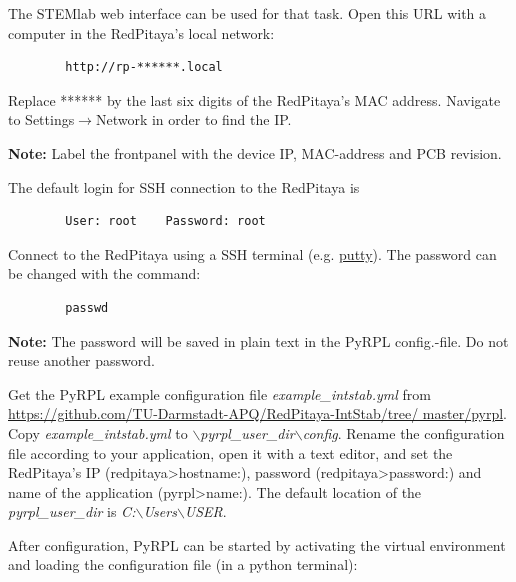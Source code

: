 \documentclass[twoside,a4paper]{refart}
\begin{document}
The STEMlab web interface can be used for that task. Open this URL with a computer in the RedPitaya's local network:
\begin{tcolorbox}
	\begin{verbatim}
		http://rp-******.local
	\end{verbatim}
\end{tcolorbox}
Replace ****** by the last six digits of the RedPitaya's MAC address. Navigate to Settings$\rightarrow$Network in order to find the IP.

\textbf{Note:}
Label the frontpanel with the device IP, MAC-address and PCB revision.


 The default login for SSH connection to the RedPitaya is

\begin{tcolorbox}
	\begin{verbatim}
		User: root    Password: root
	\end{verbatim}
\end{tcolorbox}

Connect to the RedPitaya using a SSH terminal (e.g. \href{https://www.putty.org/}{putty}). The password can be changed with the command:
\begin{tcolorbox}
	\begin{verbatim}
		passwd
	\end{verbatim}
\end{tcolorbox}

\textbf{Note: }The password will be saved in plain text in the PyRPL config.-file. Do not reuse another password.

Get the PyRPL example configuration file \textit{example\_intstab.yml} from \href{https://github.com/TU-Darmstadt-APQ/RedPitaya-IntStab/tree/master/pyrpl}{https://github.com/TU-Darmstadt-APQ/RedPitaya-IntStab/tree/ master/pyrpl}. Copy \textit{example\_intstab.yml} to \textit{$\backslash$pyrpl\_user\_dir$\backslash$config}. Rename the configuration file according to your application, open it with a text editor, and set the RedPitaya's IP (redpitaya>hostname:), password  (redpitaya>password:) and name of the application (pyrpl>name:). The default location of the \textit{pyrpl\_user\_dir} is \textit{C:$\backslash$Users$\backslash$USER}.

After configuration, PyRPL can be started by activating the virtual environment and loading the configuration file (in a python terminal):
\end{document}
